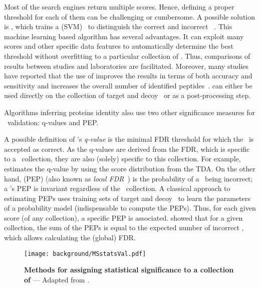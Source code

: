 Most of the search engines return multiple scores.
Hence, defining a proper threshold for each of them can be challenging or cumbersome.
A possible solution is ,
which trains a  (\gls{SVM})~
to distinguish the correct and incorrect \psms{}~.
This machine learning based algorithm has several advantages.
It can exploit many scores and other specific data features
to automatically determine the best threshold
without overfitting to a particular collection of \psms.
Thus, comparisons of results between studies and laboratories are facilitated.
Moreover, many studies have reported that the use of 
improves the results in terms of both accuracy and sensitivity and
increases the overall number of identified peptides~.
 can either be used directly on
the collection of target and decoy \psms\
or as a post-processing step.\mybr\

\vspace{-0.7mm}
Algorithms inferring proteins identity also use
two other significance measures for \psm\ validation:
q-values and \gls{PEP}.\mybr\

\vspace{-0.7mm}
A possible definition of \psm's \emph{q-value}\label{qvalP} is
the minimal \gls{FDR} threshold for which the \psm\ is accepted as correct.
As the q-values are derived from the \gls{FDR},
which is specific to a \psm\ collection,
they are also (solely) specific to this collection.
For example,
 estimates the q-value
by using the score distribution from the \gls{TDA}.
On the other hand,
 (\gls{PEP})\label{PEP}
(also known as \emph{local \gls{FDR}}~)
is the probability of a \psm\ being incorrect;
a \psm's \gls{PEP} is invariant regardless of the \psms\ collection.
A classical approach to estimating \glspl{PEP} uses
training sets of target and decoy \psms\ to learn the parameters
of a probability model (indispensable to compute the \glspl{PEP}).
Thus, for each given score (of any collection), a specific \gls{PEP} is associated.
\citet{Choi2008-ec} showed that for a given collection,
the sum of the \glspl{PEP} is equal to the expected number of incorrect \psms,
which allows calculating the (global) \gls{FDR}.\mybr\

\begin{figure}[!htbp]
    \texttt{[image: background/MSstatsVal.pdf]}\centering
    \vspace{-3mm}
    \caption[Methods for assigning statistical significance]{\label{fig:MSstatval}%
    \textbf{Methods for assigning statistical significance to a collection of \psms}
   --- Adapted from \mycite{Kall2008-tf}.}
\end{figure}


